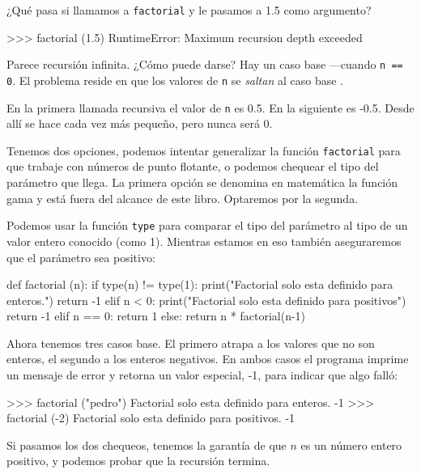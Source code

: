   

¿Qué pasa si llamamos a \texttt{factorial} y le pasamos a 1.5 como
argumento?

\begin{pyconcode}
>>> factorial (1.5)
RuntimeError: Maximum recursion depth exceeded
\end{pyconcode}
 Parece recursión infinita. ¿Cómo puede darse? Hay un caso base —cuando
\texttt{n == 0}. El problema reside en que los valores de \texttt{n}
se {\em saltan} al caso base .

 

En la primera llamada recursiva el valor de \texttt{n} es 0.5. En
la siguiente es -0.5. Desde allí se hace cada vez más pequeño, pero
nunca será 0.

Tenemos dos opciones, podemos intentar generalizar la función \texttt{factorial}
para que trabaje con números de punto flotante, o podemos chequear
el tipo del parámetro que llega. La primera opción se denomina en
matemática la función gama y está fuera del alcance de este libro.
Optaremos por la segunda.


Podemos usar la función \texttt{type} para comparar el tipo del parámetro
al tipo de un valor entero conocido (como 1). Mientras estamos en
eso también aseguraremos que el parámetro sea positivo:

\begin{pythoncode}
def factorial (n):
  if type(n) != type(1):
    print("Factorial solo esta definido para enteros.")
    return -1
  elif n < 0:
    print("Factorial solo esta definido para positivos")
    return -1
  elif n == 0:
    return 1
  else:
    return n * factorial(n-1)
\end{pythoncode}

Ahora tenemos tres casos base. El primero atrapa a los valores que
no son enteros, el segundo a los enteros negativos. En ambos casos
el programa imprime un mensaje de error y retorna un valor especial,
-1, para indicar que algo falló:
\begin{pyconcode}
>>> factorial ("pedro")
Factorial solo esta definido para enteros.
-1
>>> factorial (-2)
Factorial solo esta definido para positivos.
-1
\end{pyconcode}

Si pasamos los dos chequeos, tenemos la garantía de que $n$ es un
número entero positivo, y podemos probar que la recursión termina.

